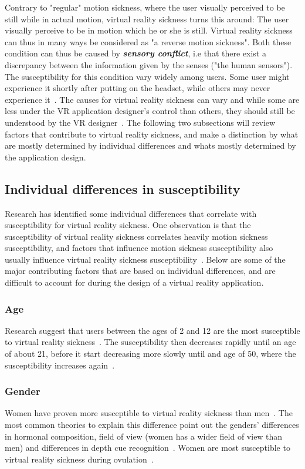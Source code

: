 Contrary to "regular" motion sickness, where the user visually perceived to be still while in actual motion, 
virtual reality sickness turns this around: The user visually perceive to be in motion which he or she is still. 
Virtual reality sickness can thus in many ways be considered as "a reverse motion sickness". Both these condition can thus be caused by
\textbf{\textit{sensory conflict}}, i.e that there exist a discrepancy between the information given by the senses ("the human sensors").
The susceptibility for this condition vary widely among users. Some user might experience it shortly after putting on the headset, 
while others may never experience it~\cite{Stanney2003}.
The causes for virtual reality sickness can vary and while some are less under the VR application designer's control than others, 
they should still be understood by the VR designer~\cite{Stanney2003}. 
The following two subsections will review factors that contribute to virtual reality sickness, and make a distinction by
what are mostly determined by individual differences and whats mostly determined by the application design. 

\subsection{Individual differences in susceptibility}
Research has identified some individual differences that correlate with susceptibility for virtual reality sickness. 
One observation is that the susceptibility of virtual reality sickness correlates heavily motion sickness susceptibility, and 
factors that influence motion sickness susceptibility also usually influence virtual reality sickness susceptibility~\citep{Stanney2003}.
Below are some of the major contributing factors that are based on individual differences, and are difficult to account for during the design of a virtual reality application.


\subsubsection{Age}
Research suggest that users between the ages of 2 and 12 are the most susceptible to virtual reality sickness~\citep{Kolasinski1995}. The susceptibility then decreases
rapidly until an age of about 21, before it start decreasing more slowly until and age of 50, where the susceptibility increases again~\citep{Brooks2010}.

\subsubsection{Gender}
Women have proven more susceptible to virtual reality sickness than men~\citep{Kennedy1985}. The most common theories to explain this difference point out the genders' differences
in hormonal composition, field of view (women has a wider field of view than men) and differences in depth cue recognition~\citep{Kennedy1985}. 
Women are most susceptible to virtual reality sickness during ovulation~\citep{Clemes2005}.

